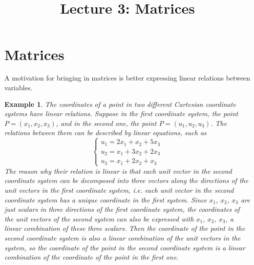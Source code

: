 \documentclass{article}
\title{Lecture 3: Matrices}
\author{}
\date{}
\newtheorem{example}{Example}
\begin{document}
    
\maketitle

\section{Matrices}

A motivation for bringing in matrices is better expressing linear relations
between variables.

\begin{example}
  The coordinates of a point in two different Cartesian coordinate systems have
  linear relations. Suppose in the first coordinate system, the point
  $P = (x_1, x_2, x_3)$, and in the second one, the point $P = (u_1, u_2, u_3)$.
  The relations between them can be described by linear equations, such as
  \[
    \left\{ \begin{array}{ll}
    u_1 = 2x_1 + x_2 + 5x_3 \\
    u_2 = x_1 + 3x_2 + 2x_3 \\
    u_3 = x_1 + 2x_2 + x_3
    \end{array} \right.
  \]
  The reason why their relation is linear is that each unit vector in the
  second coordinate system can be decomposed into three vectors along the
  directions of the unit vectors in the first coordinate system, i.e. each unit
  vector in the second coordinate system has a unique coordinate in the first
  system. Since $x_1$, $x_2$, $x_3$ are just scalars in three directions of the
  first coordinate system, the coordinates of the unit vectors of the second
  system can also be expressed with $x_1$, $x_2$, $x_3$, a linear combination
  of these three scalars. Then the coordinate of the point in the second
  coordinate system is also a linear combination of the unit vectors in the
  system, so the coordinate of the point in the second coordinate system is a
  linear combination of the coordinate of the point in the first one.
\end{example}
\end{document}
